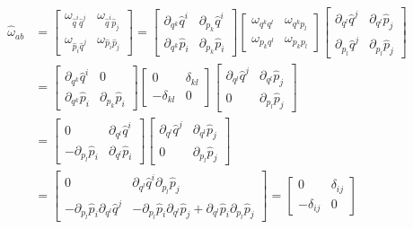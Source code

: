 \begin{equation}
	\begin{aligned}
	\hat{\omega}_{ab} &=\left[\begin{array}{cc}
		\omega_{\hat{q}^i \hat{q}^j} & \omega_{\hat{q}^i \hat{p}_j} \\
		\omega_{\hat{p}_i \hat{q}^j} & \omega_{\hat{p}_i \hat{p}_j} 
	\end{array} \right] = \left[\begin{array}{cc}
	\partial_{q^k} \hat{q}^i & \partial_{p_k} \hat{q}^i \\
\partial_{q^k} \hat{p}_i & \partial_{p_k} \hat{p}_i 
\end{array} \right]
\left[\begin{array}{cc}
	\omega_{q^k q^l} & \omega_{q^k p_l} \\
	\omega_{p_k q^l} & \omega_{p_k p_l} 
\end{array} \right]
\left[\begin{array}{cc}
	\partial_{q^l} \hat{q}^j & \partial_{q^l} \hat{p}_j \\
	\partial_{p_l} \hat{q}^j & \partial_{p_l} \hat{p}_j 
\end{array} \right]\\
&= \left[\begin{array}{cc}
	\partial_{q^k} \hat{q}^i & 0 \\
	\partial_{q^k} \hat{p}_i & \partial_{p_k} \hat{p}_i 
\end{array} \right]
\left[\begin{array}{cc}
	0 & \delta_{kl} \\
	- \delta_{kl} & 0 
\end{array} \right]
\left[\begin{array}{cc}
	\partial_{q^l} \hat{q}^j & \partial_{q^l} \hat{p}_j \\
	0 & \partial_{p_l} \hat{p}_j 
\end{array} \right] \\
&= \left[\begin{array}{cc}
	0 & \partial_{q^l} \hat{q}^i \\
	- \partial_{p_l} \hat{p}_i  & \partial_{q^l} \hat{p}_i 
\end{array} \right]
\left[\begin{array}{cc}
	\partial_{q^l} \hat{q}^j & \partial_{q^l} \hat{p}_j \\
	0 & \partial_{p_l} \hat{p}_j 
\end{array} \right] \\
&= \left[\begin{array}{cc}
	0 & \partial_{q^l} \hat{q}^i \partial_{p_l} \hat{p}_j  \\
	- \partial_{p_l} \hat{p}_i \partial_{q^l} \hat{q}^j  & 
	- \partial_{p_l} \hat{p}_i \partial_{q^l} \hat{p}_j +  \partial_{q^l} \hat{p}_i \partial_{p_l} \hat{p}_j 
\end{array} \right] = \left[\begin{array}{cc}
0 & \delta_{ij} \\
- \delta_{ij} & 0 
\end{array} \right]
\end{aligned}
\end{equation}

